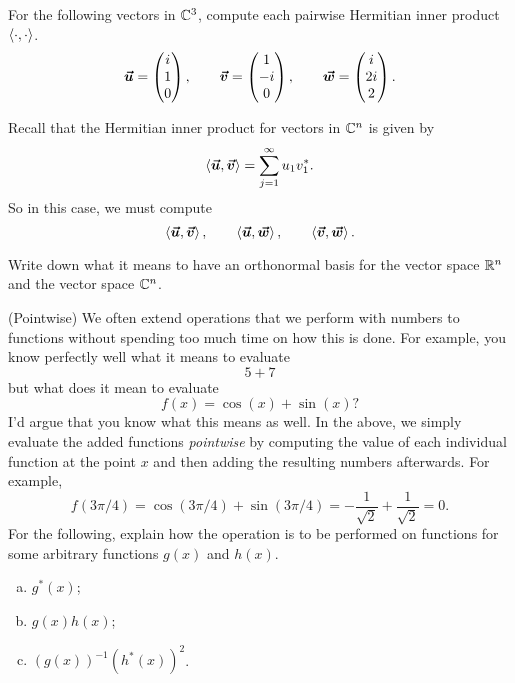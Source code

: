 \documentclass[12pt]{article} %
\begin{document}
\newpage
\begin{problem}
	For the following vectors in $\mathbb{C}^3$, compute each pairwise Hermitian inner product $\left\langle \cdot, \cdot \right\rangle$.  
	\[
		\boldsymbol{\vec{u}} = \begin{pmatrix} i \\ 1 \\ 0 \end{pmatrix}, \qquad \boldsymbol{\vec{v}} = \begin{pmatrix} 1 \\ -i \\ 0 \end{pmatrix}, \qquad \boldsymbol{\vec{w}} = \begin{pmatrix} i \\ 2i \\ 2 \end{pmatrix}.
	\]
\end{problem}
\begin{solution}
	Recall that the Hermitian inner product for vectors in $\mathbb{C}^n$ is given by
	\[
	\left\langle \boldsymbol{\vec{u}}, \boldsymbol{\vec{v}} \right\rangle = \sum_{j=1}^\infty u_1 v_1^*.
	\]
	So in this case, we must compute
	\[
	\left\langle \boldsymbol{\vec{u}}, \boldsymbol{\vec{v}} \right\rangle, \qquad \left\langle \boldsymbol{\vec{u}}, \boldsymbol{\vec{w}} \right\rangle, \qquad \left\langle \boldsymbol{\vec{v}}, \boldsymbol{\vec{w}} \right\rangle.
	\]
\end{solution}

\newpage
\begin{problem}
	Write down what it means to have an orthonormal basis for the vector space $\mathbb{R}^n$ and the vector space $\mathbb{C}^n$.
\end{problem}


\newpage
\begin{problem}
	(Pointwise) We often extend operations that we perform with numbers to functions without spending too much time on how this is done. For example, you know perfectly well what it means to evaluate
	\[
		5+7
	\]
	but what does it mean to evaluate
	\[
		f(x)=\cos(x)+\sin(x)?
	\]
	I'd argue that you know what this means as well.  In the above, we simply evaluate the added functions \emph{pointwise} by computing the value of each individual function at the point $x$ and then adding the resulting numbers afterwards. For example,
	\[
		f(3\pi/4)=\cos(3\pi/4) + \sin(3\pi/4)= -\frac{1}{\sqrt{2}}+\frac{1}{\sqrt{2}}=0.
	\]
	For the following, explain how the operation is to be performed on functions for some arbitrary functions $g(x)$ and $h(x)$.
	\begin{enumerate}[(a)]
		\item $g^*(x)$;
		\item $g(x)h(x)$;
		\item $(g(x))^{-1}(h^*(x))^2$.
	\end{enumerate}
\end{problem}
\end{document}
